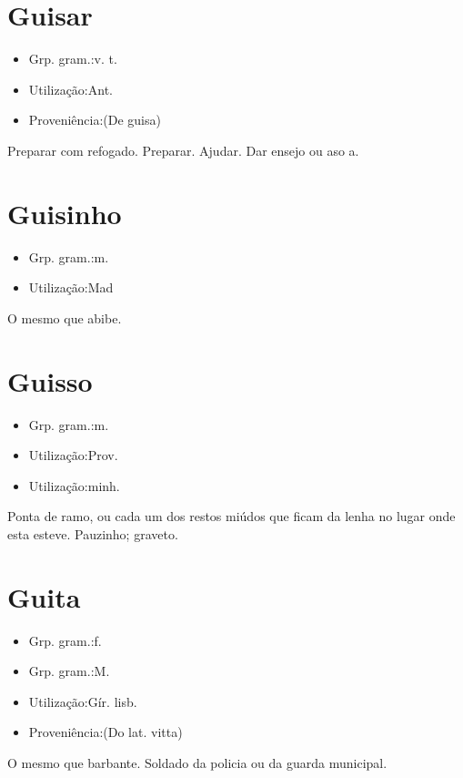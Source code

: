 \section{Guisar}
\begin{itemize}
\item {Grp. gram.:v. t.}
\end{itemize}
\begin{itemize}
\item {Utilização:Ant.}
\end{itemize}
\begin{itemize}
\item {Proveniência:(De \textunderscore guisa\textunderscore )}
\end{itemize}
Preparar com refogado.
Preparar.
Ajudar.
Dar ensejo ou aso a.
\section{Guisinho}
\begin{itemize}
\item {Grp. gram.:m.}
\end{itemize}
\begin{itemize}
\item {Utilização:Mad}
\end{itemize}
O mesmo que \textunderscore abibe\textunderscore .
\section{Guisso}
\begin{itemize}
\item {Grp. gram.:m.}
\end{itemize}
\begin{itemize}
\item {Utilização:Prov.}
\end{itemize}
\begin{itemize}
\item {Utilização:minh.}
\end{itemize}
Ponta de ramo, ou cada um dos restos miúdos que ficam da lenha no lugar onde esta esteve.
Pauzinho; graveto.
\section{Guita}
\begin{itemize}
\item {Grp. gram.:f.}
\end{itemize}
\begin{itemize}
\item {Grp. gram.:M.}
\end{itemize}
\begin{itemize}
\item {Utilização:Gír. lisb.}
\end{itemize}
\begin{itemize}
\item {Proveniência:(Do lat. \textunderscore vitta\textunderscore )}
\end{itemize}
O mesmo que \textunderscore barbante\textunderscore .
Soldado da policia ou da guarda municipal.
